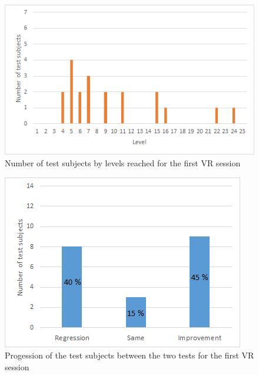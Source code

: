 \documentclass[12pt, openany, twocolumn]{article}
\begin{document}

        \begin{figure}
            \includegraphics[scale=0.74]{graphics/bargraph-vr-nbtestsubjectperlevel2.png}
            \caption{Number of test subjects by levels reached for the first VR session}
        \end{figure}

        \begin{figure}
            \includegraphics[scale=0.74]{graphics/rsi-vr.png}
            \caption{Progession of the test subjects between the two tests for the first VR session}
        \end{figure}

                    
\end{document}
